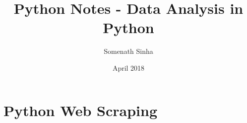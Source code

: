 

\title{Python Notes - Data Analysis in Python}
\author{Somenath Sinha}
\date{April 2018}


	\maketitle
	\newpage
	\tableofcontents
	
	\part{Python Web Scraping}
	
	
	
